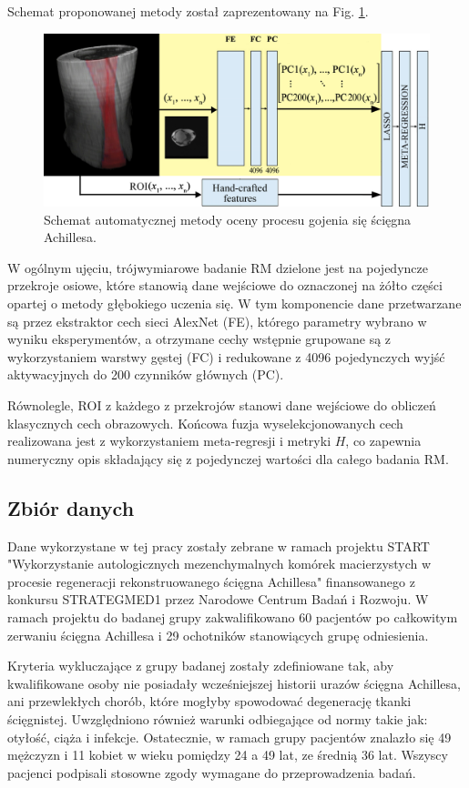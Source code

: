 Schemat proponowanej metody został zaprezentowany na Fig. \ref{fig:net}. 
\begin{figure}[h!]
	\includegraphics[width=\textwidth]{figures/net.jpg}
	\caption{Schemat automatycznej metody oceny procesu gojenia się ścięgna Achillesa.} \label{fig:net}
\end{figure}
W ogólnym ujęciu, trójwymiarowe badanie RM dzielone jest na pojedyncze przekroje osiowe, które stanowią dane wejściowe do oznaczonej na żółto części opartej o metody głębokiego uczenia się. W tym komponencie dane przetwarzane są przez ekstraktor cech sieci AlexNet (FE), którego parametry wybrano w wyniku eksperymentów, a otrzymane cechy wstępnie grupowane są z wykorzystaniem warstwy gęstej (FC) i redukowane z 4096 pojedynczych wyjść aktywacyjnych do 200 czynników głównych (PC).

Równolegle, ROI z każdego z przekrojów stanowi dane wejściowe do obliczeń klasycznych cech obrazowych. Końcowa fuzja wyselekcjonowanych cech realizowana jest z wykorzystaniem meta-regresji i metryki $H$, co zapewnia numeryczny opis składający się z pojedynczej wartości dla całego badania RM.

\subsection{Zbiór danych}

Dane wykorzystane w tej pracy zostały zebrane w ramach projektu START "Wykorzystanie autologicznych mezenchymalnych komórek macierzystych w procesie regeneracji rekonstruowanego ścięgna Achillesa" finansowanego z konkursu STRATEGMED1 przez Narodowe Centrum Badań i Rozwoju. W ramach projektu do badanej grupy zakwalifikowano 60 pacjentów po całkowitym zerwaniu ścięgna Achillesa i 29 ochotników stanowiących grupę odniesienia. 

Kryteria wykluczające z grupy badanej zostały zdefiniowane tak, aby kwalifikowane osoby nie posiadały wcześniejszej historii urazów ścięgna Achillesa, ani przewlekłych chorób, które mogłyby spowodować degenerację tkanki ścięgnistej. Uwzględniono również warunki odbiegające od normy takie jak: otyłość, ciąża i infekcje. Ostatecznie, w ramach grupy pacjentów znalazło się 49 mężczyzn i 11 kobiet w wieku pomiędzy 24 a 49 lat, ze średnią 36 lat. Wszyscy pacjenci podpisali stosowne zgody wymagane do przeprowadzenia badań.   


